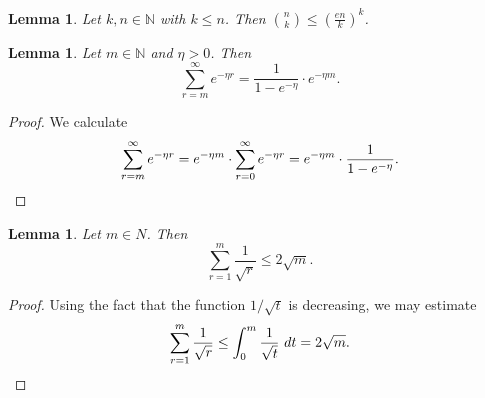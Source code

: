 \documentclass[11pt, letterpaper, fleqn]{article}
\newtheorem{lemma}[theorem]{Lemma}
\theoremstyle{plain}
\newcommand{\N}{\mathbb{N}}
\begin{document}
\combinatorial*

\begin{lemma} \label{lem:binomial}
Let $k, n \in \N$ with $k \le n$. Then 
$\binom{n}{k} \le \left(\frac{en}{k}\right)^k$.
\end{lemma}


\begin{lemma} \label{lem:inv-exp-tail}
Let $m \in \N$ and $\eta > 0$. Then
\[\sum_{r = m}^\infty e^{-\eta r} = \frac{1}{1 - e^{-\eta}} \cdot e^{-\eta m}.\]
\end{lemma}

\begin{proof}
We calculate
\[\sum_{r = m}^\infty e^{-\eta r} = e^{-\eta m}  \cdot \sum_{r = 0}^\infty e^{-\eta r} = e^{-\eta m} \cdot \frac{1}{1 - e^{-\eta}}.\qedhere
\]
\end{proof}




\begin{lemma} \label{lem:inv-sqrt}
Let $m \in N$. Then
\[\sum_{r = 1}^m \frac{1}{\sqrt{r}} \le 2 \sqrt{m}.\]
\end{lemma}

\begin{proof}
Using the fact that the function $1/\sqrt{t}$ is decreasing, we may estimate
\[
  \sum_{r = 1}^m \frac{1}{\sqrt{r}} \le \int_{0}^m \frac{1}{\sqrt{t}} \ dt = 2\sqrt{m}.\qedhere
\]
\end{proof}
\end{document}
